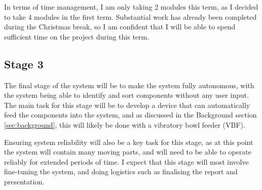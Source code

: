 \noindent
In terms of time management, I am only taking 2 modules this term, as I decided to take 4 modules in the first term. Substantial work has already been completed
during the Christmas break, so I am confident that I will be able to spend sufficient time on the project during this term.

\subsection{Stage 3}
The final stage of the system will be to make the system fully autonomous, with the system being able to identify and sort components without any user input.
The main task for this stage will be to develop a device that can automatically feed the components into the system, and as 
discussed in the Background section \ref*{sec:background}, this will likely be done with a vibratory bowl feeder (VBF).

Ensuring system reliability will also be a key task for this stage, as at this point the system will contain many moving parts, and will need to be able to
operate reliably for extended periods of time. I expect that this stage will most involve fine-tuning the system, and doing logistics such as
finalising the report and presentation.